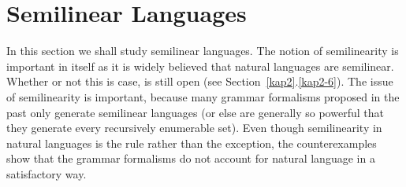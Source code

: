 \section{Semilinear Languages}
%
%
%
In this section we shall study semilinear languages. The notion of 
semilinearity is important in itself as it is widely believed that 
natural languages are semilinear. Whether or not this is case, is 
still open (see Section~\ref{kap2}.\ref{kap2-6}). The issue of 
semilinearity is important, because many grammar formalisms proposed 
in the past only generate semilinear languages (or else are generally 
so powerful that they generate every recursively enumerable set). 
Even though semilinearity in natural languages is the rule rather 
than the exception, the counterexamples show that the grammar 
formalisms do not account for natural language in a satisfactory 
way. 

